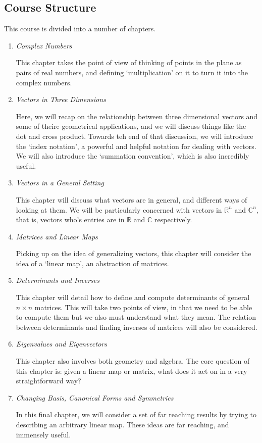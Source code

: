 \documentclass[a4]{scrartcl}
\begin{document}
\subsection{Course Structure}

This course is divided into a number of chapters.

\begin{enumerate}
	\item \emph{Complex Numbers}

	This chapter takes the point of view of thinking of points in the plane as pairs of real numbers, and defining `multiplication' on it to turn it into the complex numbers.

	\item \emph{Vectors in Three Dimensions}
	
	Here, we will recap on the relationship between three dimensional vectors and some of theire geometrical applications, and we will discuss things like the dot and cross product. Towards teh end of that discussion, we will introduce the `index notation', a powerful and helpful notation for dealing with vectors. We will also introduce the `summation convention', which is also incredibly useful.

	\item \emph{Vectors in a General Setting}
	
	This chapter will discuss what vectors are in general, and different ways of looking at them. We will be particularly concerned with vectors in $\mathbb{R}^n$ and $\mathbb{C}^n$, that is, vectors who's entries are in $\mathbb{R}$ and $\mathbb{C}$ respectively.

	\item \emph{Matrices and Linear Maps}
	
	Picking up on the idea of generalizing vectors, this chapter will consider the idea of a `linear map', an abstraction of matrices. 

	\item \emph{Determinants and Inverses}
	
	This chapter will detail how to define and compute determinants of general $n \times n$ matrices. This will take two points of view, in that we need to be able to compute them but we also must understand what they mean. The relation between determinants and finding inverses of matrices will also be considered.

	\item \emph{Eigenvalues and Eigenvectors}
	
	This chapter also involves both geometry and algebra. The core question of this chapter is: given a linear map or matrix, what does it act on in a very straightforward way?

	\item \emph{Changing Basis, Canonical Forms and Symmetries}
	
	In this final chapter, we will consider a set of far reaching results by trying to describing an arbitrary linear map. These ideas are far reaching, and immensely useful.
\end{enumerate}
\end{document}
